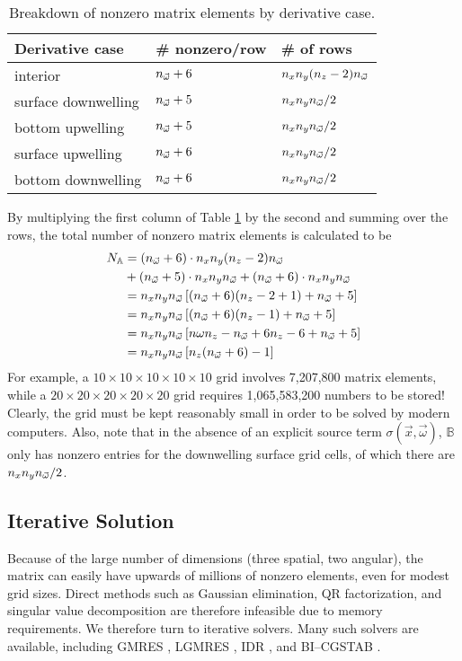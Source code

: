 \begin{table}[H]
  \centering
  \caption{Breakdown of nonzero matrix elements by derivative case.}
  \begin{tabular}{p{}p{}p{}}
    \toprule
    \textbf{Derivative case} & \textbf{\# nonzero/row} & \textbf{\# of rows} \\
    \midrule
    interior & ${n_{\vec{\omega}}}+6$ & $n_xn_y(n_z-2){n_{\vec{\omega}}}$ \\
    surface downwelling & ${n_{\vec{\omega}}}+5$ & $n_xn_y{n_{\vec{\omega}}}/2$ \\
    bottom upwelling & ${n_{\vec{\omega}}}+5$ & $n_xn_y{n_{\vec{\omega}}}/2$ \\
    surface upwelling & ${n_{\vec{\omega}}}+6$ & $n_xn_y{n_{\vec{\omega}}}/2$ \\
    bottom downwelling & ${n_{\vec{\omega}}}+6$ & $n_xn_y{n_{\vec{\omega}}}/2$ \\
    \bottomrule
  \end{tabular}
  \label{tab:nonzero}
\end{table}

By multiplying the first column of Table \ref{tab:nonzero} by the second and summing over the rows, the total number of nonzero matrix elements is calculated to be
\begin{align}
  N_\mathbb{A} &= ({n_{\vec{\omega}}}+6) \cdot n_xn_y(n_z-2){n_{\vec{\omega}}} \nonumber\\
    &+   ({n_{\vec{\omega}}}+5) \cdot n_xn_y{n_{\vec{\omega}}}
    +   ({n_{\vec{\omega}}}+6) \cdot n_xn_y{n_{\vec{\omega}}} \nonumber\\
  &= n_x n_y {n_{\vec{\omega}}} \left[({n_{\vec{\omega}}}+6)(n_z-2+1)+{n_{\vec{\omega}}}+5 \right] \nonumber\\
  &= n_x n_y {n_{\vec{\omega}}} \left[({n_{\vec{\omega}}}+6)(n_z-1)+{n_{\vec{\omega}}}+5 \right] \nonumber\\
  &=  n_x n_y {n_{\vec{\omega}}} \left[n\omega n_z -{n_{\vec{\omega}}} + 6n_z - 6 + {n_{\vec{\omega}}} + 5 \right] \nonumber\\
    &=  n_x n_y {n_{\vec{\omega}}} \left[n_z({n_{\vec{\omega}}}+6)-1\right]
    \label{eqn:nnz}
\end{align}
For example, a $10 \times 10 \times 10 \times 10 \times 10$ grid involves 7,207,800 matrix elements, while a $20 \times 20 \times 20 \times 20 \times 20$ grid requires 1,065,583,200 numbers to be stored!
Clearly, the grid must be kept reasonably small in order to be solved by modern computers.
Also, note that in the absence of an explicit source term $\sigma(\vec{x}, \vec{\omega})$, $\mathbb{B}$ only has nonzero entries for the downwelling surface grid cells, of which there are $n_x n_y {n_{\vec{\omega}}}/2$.

\subsection{Iterative Solution}
\label{sec:iterative_solution}
Because of the large number of dimensions (three spatial, two angular), the matrix can easily have upwards of millions of nonzero elements,
even for modest grid sizes.
Direct methods such as Gaussian elimination, QR factorization, and singular value decomposition are therefore infeasible due to memory requirements.
We therefore turn to iterative solvers.
Many such solvers are available, including GMRES \cite{saad_gmres:_1985}, LGMRES \cite{baker_technique_2005}, IDR \cite{sonneveld_idrs:_2008}, and BI--CGSTAB \cite{van_der_vorst_bi-cgstab:_1992}.

